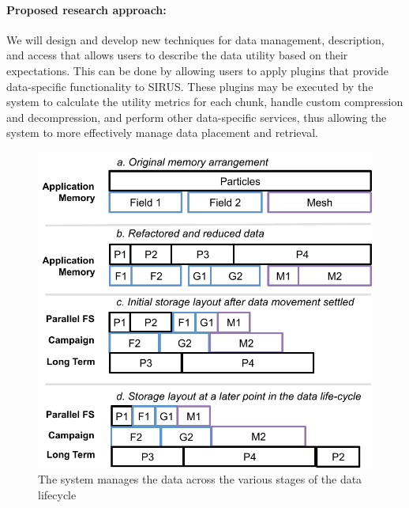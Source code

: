 \paragraph{Proposed research approach:} 
We will design and develop new techniques for data management, description,
and access that allows users to describe the data utility based on their
expectations. This can be done by allowing users to apply plugins that
provide data-specific functionality to SIRUS.
These plugins may be executed by the system to
calculate the utility metrics for each chunk, handle custom compression
and decompression, and perform other data-specific services, thus allowing
the system to more effectively manage data placement and retrieval.
%

\begin{figure}
        \begin{centering}
        \vspace{-4ex}
        \includegraphics[scale=0.7]{graphics/SSIO-bucket.pdf}
        \caption{The system manages the data across the various stages of the data lifecycle}
        \label{fig:ssio-bucket}
        \end{centering}
      \vspace{-1ex}
\end{figure}

